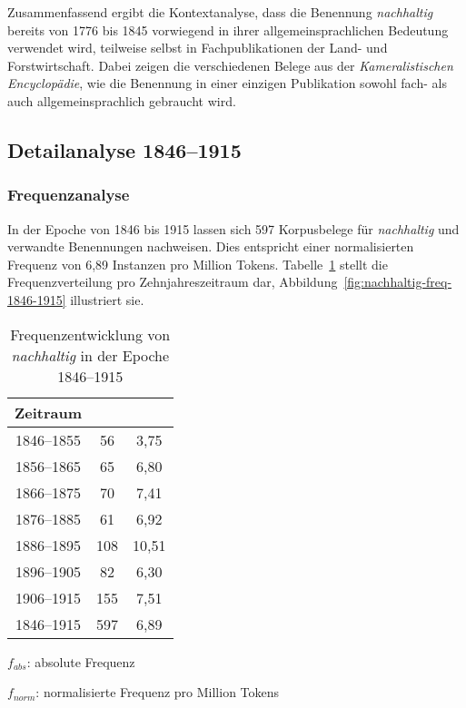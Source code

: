 \documentclass[
    german,
    a4paper,%
    12pt,%
    oneside,%
    toc=bibliography,
    final,
]{scrartcl}
\begin{document}
Zusammenfassend ergibt die Kontextanalyse, dass die Benennung \textit{nachhaltig} bereits von 1776 bis 1845 vorwiegend in ihrer allgemeinsprachlichen Bedeutung verwendet wird, teilweise selbst in Fachpublikationen der Land- und Forstwirtschaft. Dabei zeigen die verschiedenen Belege aus der \textit{Kameralistischen Encyclopädie}, wie die Benennung in einer einzigen Publikation sowohl fach- als auch allgemeinsprachlich gebraucht wird.



\subsection{Detailanalyse 1846–1915}
\label{subsec:detail-1846–1915}

\subsubsection{Frequenzanalyse}

In der Epoche von 1846 bis 1915 lassen sich 597 Korpusbelege für \textit{nachhaltig} und verwandte Benennungen nachweisen. Dies entspricht einer normalisierten Frequenz von 6,89 Instanzen pro Million Tokens. Tabelle~\ref{tab:freq-epoche2} stellt die Frequenzverteilung pro Zehnjahreszeitraum dar, Abbildung~\ref{fig:nachhaltig-freq-1846-1915} illustriert sie.

\begin{table}[h!]
	\centering
	\renewcommand{\arraystretch}{1.5}
	
	\caption{Frequenzentwicklung von \textit{nachhaltig} in der Epoche 1846–1915}
	\label{tab:freq-epoche2}
	
	\begin{threeparttable}
	
	\begin{tabular}{ccc}
	\textbf{Zeitraum} & \boldmath{$f_{abs}$} & \boldmath{$f_{norm}$} \\ \hline
	1846–1855 & 56 & 3,75 \\ \hline
	1856–1865 & 65 & 6,80 \\ \hline
	1866–1875 & 70 & 7,41 \\ \hline
	1876–1885 & 61 & 6,92 \\ \hline
	1886–1895 & 108 & 10,51 \\ \hline
	1896–1905 & 82 & 6,30 \\ \hline
	1906–1915 & 155 & 7,51 \\ \hline\hline
	1846–1915 & 597 & 6,89 \\ \hline
	\end{tabular} 
	
	\begin{tablenotes}
	\footnotesize
	\setlength{\itemindent}{-1.2em}
	\item $f_{abs}$: absolute Frequenz
	\item $f_{norm}$: normalisierte Frequenz pro Million Tokens
	\end{tablenotes}
	
	\end{threeparttable}
\end{table}
\end{document}
